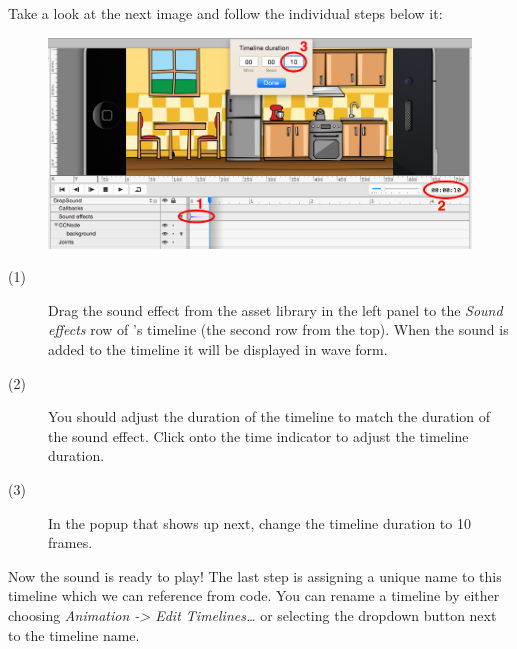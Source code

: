 \begin{leftbar}
Take a look at the next image and follow the individual steps below it:
\begin{figure}[H]
    \centering
    \includegraphics[width=0.9\linewidth]{images/Chapter2/audio_timeline.png}
\end{figure}
\begin{description}
\item[(1)] Drag the sound effect from the asset library in the left panel to the
\textit{Sound effects} row of \SB{}'s timeline (the second row from the top). When the sound
is added to the timeline it will be displayed in wave form.
\item[(2)] You should adjust the duration of the timeline to match the
duration of the sound effect. Click onto the time indicator to adjust the
timeline duration.
\item[(3)] In the popup that shows up next, change the timeline duration to 10
frames.
\end{description}
\end{leftbar}

Now the sound is ready to play! The last step is assigning a unique name to this
timeline which we can reference from code. You can rename a timeline by either
choosing \textit{Animation -> Edit Timelines\ldots} or selecting the dropdown
button next to the timeline name.

